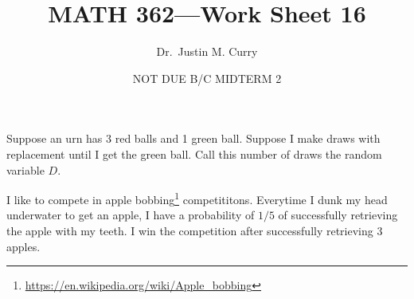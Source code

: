 \documentclass[addpoints,12pt]{exam}
\title{\vspace{-1in} MATH 362---Work Sheet 16}
\date{NOT DUE B/C MIDTERM 2}
\author{Dr.~Justin M. Curry}
\begin{document}
\maketitle






\begin{questions}

\question Suppose an urn has 3 red balls and 1 green ball. Suppose I make draws with replacement until I get the green ball. Call this number of draws the random variable $D$.
\noaddpoints
{}
\addpoints

\question I like to compete in apple bobbing\footnote{\url{https://en.wikipedia.org/wiki/Apple_bobbing}} competititons. Everytime I dunk my head underwater to get an apple, I have a probability of $1/5$ of successfully retrieving the apple with my teeth. I win the competition after successfully retrieving 3 apples. 


\end{questions}
\end{document}
